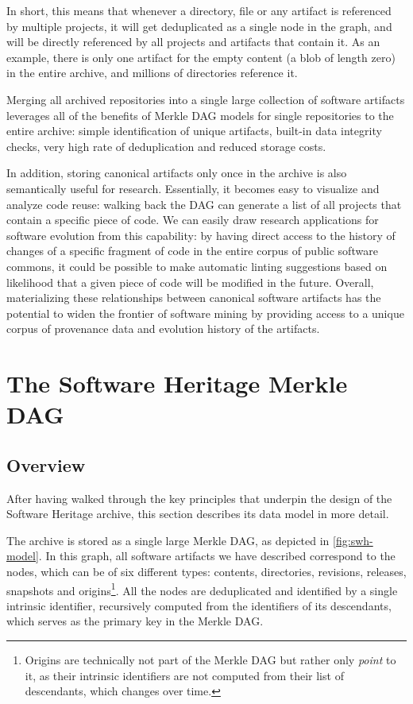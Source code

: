 In short, this means that whenever a directory, file or any artifact is
referenced by multiple projects, it will get deduplicated as a single node in
the graph, and will be directly referenced by all projects and artifacts
that contain it. As an example, there is only one artifact for the empty
content (a blob of length zero) in the entire archive, and millions of
directories reference it.

Merging all archived repositories into a single large collection of software
artifacts leverages all of the benefits of Merkle \gls{DAG} models for single
repositories to the entire archive: simple identification of unique artifacts,
built-in data integrity checks, very high rate of deduplication and reduced
storage costs.

In addition, storing canonical artifacts only once in the archive is also
semantically useful for research. Essentially, it becomes easy to visualize
and analyze code reuse: walking back the \gls{DAG} can generate a list of all
projects that contain a specific piece of code.
We can easily draw research applications for software evolution from this
capability: by having direct access to the history of changes of a specific
fragment of code in the entire corpus of public software commons, it could be
possible to make automatic linting suggestions based on likelihood that a given
piece of code will be modified in the future. Overall, materializing these
relationships between canonical software artifacts has the potential to widen
the frontier of software mining by providing access to a unique corpus of
provenance data and evolution history of the artifacts.


\section{The Software Heritage Merkle DAG}

\subsection{Overview}

After having walked through the key principles that underpin the design of the
Software Heritage archive, this section describes its data model in more
detail.

The archive is stored as a single large Merkle \gls{DAG}, as depicted
in \cref{fig:swh-model}. In this graph, all software artifacts we have
described correspond to the nodes, which can be of six different types:
contents, directories, revisions, releases, snapshots and
origins\footnote{Origins are technically not part of the Merkle DAG but rather
only \emph{point} to it, as their intrinsic identifiers are not computed from
their list of descendants, which changes over time.}.
All the nodes are deduplicated and identified by a single intrinsic
identifier, recursively computed from the identifiers of its descendants, which
serves as the primary key in the Merkle \gls{DAG}.

